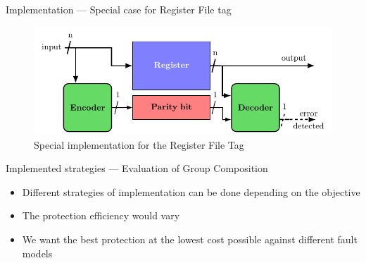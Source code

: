 \begin{frame}{Implementation — Special case for Register File tag}
    \begin{figure}
        \centering
        \includegraphics[width=.9\textwidth, page=5]{src/4_strategies/img/archi_contremesures.pdf}
        \caption{Special implementation for the Register File Tag}
        \label{fig:secded_implem_rf}
    \end{figure}
\end{frame}
\begin{frame}{Implemented strategies — Evaluation of Group Composition}
    \begin{block}{}
        \begin{itemize}
            \justifying
            \item Different strategies of implementation can be done depending on the objective
            \item The protection efficiency would vary
            \item We want the best protection at the lowest cost possible against different fault models
        \end{itemize}
    \end{block}
\end{frame}

